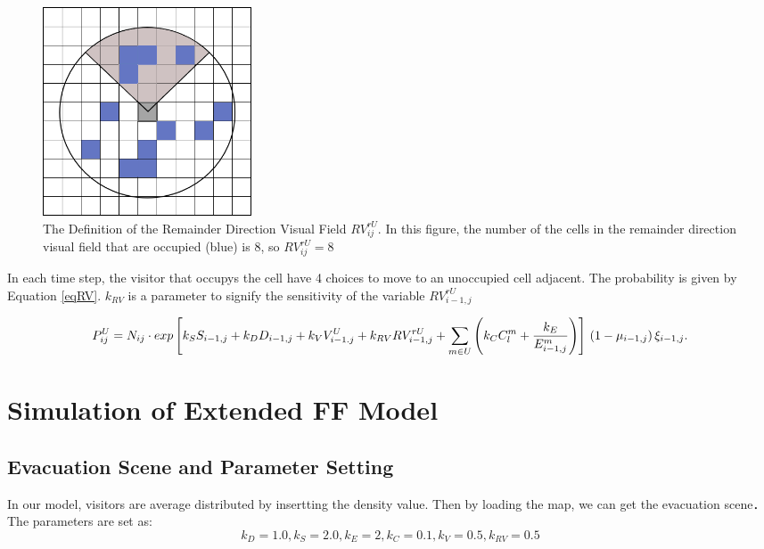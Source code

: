\documentclass{mcmthesis}
\begin{document}
\begin{figure}[H]
	\centering
	\includegraphics[width=0.3\textwidth]{example.png}
\captionsetup{font=small, labelfont=bf}
	\caption{The Definition of the Remainder Direction Visual Field $RV^{rU}_{ij}$. In this figure, the number of the cells in the remainder direction visual field that are occupied (blue) is 8, so $RV^{rU}_{ij}=8$}
	\label{calRV}
\end{figure}

In each time step, the visitor that occupys the cell have 4 choices to move to an unoccupied cell adjacent. The probability is given by Equation \ref{eqRV}. $k_{RV}$ is a parameter to signify the sensitivity of the variable $RV^{rU}_{i-1,j}$

\begin{dmath}
	P^U_{ij}=N_{ij}\cdot exp\left[k_SS_{i-1,j}+k_DD_{i-1,j}+k_VV^{U}_{i-1.j}+k_{RV}RV^{rU}_{i-1,j}+\sum_{m\in U}\left(k_CC^m_l+\frac{k_E}{E^m_{i-1,j}}\right)\right] \\  \left(1-\mu_{i-1,j}\right)\xi_{i-1,j}.
	\label{eqRV}
\end{dmath}

\section{Simulation of Extended FF Model}
\subsection{Evacuation Scene and Parameter Setting}
In our model, visitors are average distributed by insertting the density value. Then by loading the map, we can get the evacuation scene．The parameters are set as:
$$
k_D = 1.0, k_S = 2.0, k_E = 2, k_C = 0.1, k_V = 0.5, k_{RV} = 0.5 
$$
\end{document}
